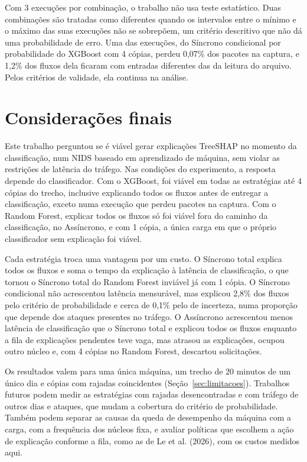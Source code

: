 \documentclass[
  article,
  12pt,
  oneside,
  a4paper,
  english,
  brazil
]{abntex2}
\begin{document}
Com 3 execuções por combinação, o trabalho não usa teste estatístico. Duas combinações são tratadas
como diferentes quando os intervalos entre o mínimo e o máximo das suas execuções não se sobrepõem,
um critério descritivo que não dá uma probabilidade de erro. Uma das execuções, do Síncrono
condicional por probabilidade do XGBoost com 4 cópias, perdeu 0,07\% dos pacotes na captura, e 1,2\%
dos fluxos dela ficaram com entradas diferentes das da leitura do arquivo. Pelos critérios de
validade, ela continua na análise.

\section{Considerações finais}
\label{sec:conclusao}

Este trabalho perguntou se é viável gerar explicações TreeSHAP no momento da classificação, num
NIDS baseado em aprendizado de máquina, sem violar as restrições de latência do tráfego. Nas
condições do experimento, a resposta depende do classificador. Com o XGBoost, foi viável em todas
as estratégias até 4 cópias do trecho, inclusive explicando todos os fluxos antes de entregar a
classificação, exceto numa execução que perdeu pacotes na captura. Com o Random Forest, explicar
todos os fluxos só foi viável fora do caminho da classificação, no Assíncrono, e com 1 cópia, a
única carga em que o próprio classificador sem explicação foi viável.

Cada estratégia troca uma vantagem por um custo. O Síncrono total explica todos os fluxos e soma o
tempo da explicação à latência de classificação, o que tornou o Síncrono total do Random Forest
inviável já com 1 cópia. O Síncrono condicional não acrescentou latência mensurável, mas explicou 2,8\% dos fluxos
pelo critério de probabilidade e cerca de 0,1\% pelo de incerteza, numa proporção que depende dos
ataques presentes no tráfego. O Assíncrono acrescentou menos latência de classificação que o
Síncrono total e explicou todos os fluxos enquanto a fila de explicações pendentes teve vaga, mas
atrasou as explicações, ocupou outro núcleo e, com 4 cópias no Random Forest, descartou solicitações.

Os resultados valem para uma única máquina, um trecho de 20 minutos de um único dia e cópias com
rajadas coincidentes (Seção~\ref{sec:limitacoes}). Trabalhos futuros podem medir as estratégias com
rajadas desencontradas e com tráfego de outros dias e ataques, que mudam a cobertura do critério de
probabilidade. Também podem separar as causas da queda de desempenho da máquina com a carga, com a
frequência dos núcleos fixa, e avaliar políticas que escolhem a ação de explicação conforme a fila,
como as de Le et al. (2026), com os custos medidos aqui.
\end{document}
